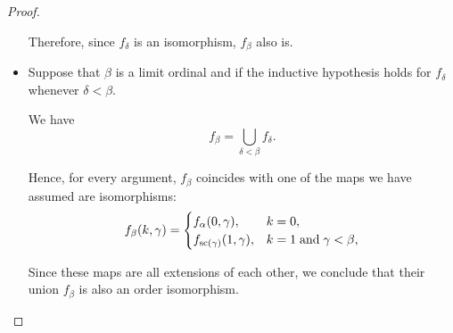 \begin{proof}
\begin{itemize}
    Therefore, since \( f_\delta \) is an isomorphism, \( f_\beta \) also is.

    \item Suppose that \( \beta \) is a limit ordinal and if the inductive hypothesis holds for \( f_\delta \) whenever \( \delta < \beta \).

    We have
    \begin{equation*}
      f_\beta = \bigcup_{\delta < \beta} f_\delta.
    \end{equation*}

    Hence, for every argument, \( f_\beta \) coincides with one of the maps we have assumed are isomorphisms:
    \begin{equation*}
      f_\beta(k, \gamma) = \begin{cases}
        f_\alpha(0, \gamma),            &k = 0, \\
        f_{\op{sc}(\gamma)}(1, \gamma), &k = 1 \T{and} \gamma < \beta,
      \end{cases}
    \end{equation*}

    Since these maps are all extensions of each other, we conclude that their union \( f_\beta \) is also an order isomorphism.
  \end{itemize}
\end{proof}

